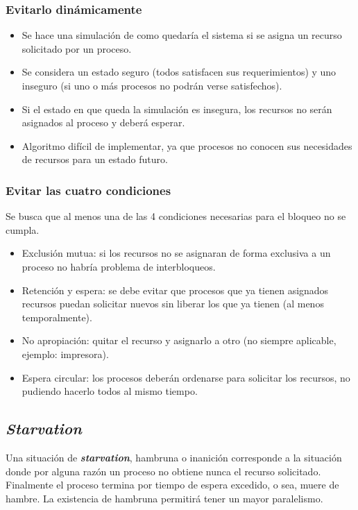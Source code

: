 \subsubsection{Evitarlo dinámicamente}
\begin{itemize}

	\item Se hace una simulación de como quedaría el sistema si se asigna un
	recurso solicitado por un proceso.

	\item Se considera un estado seguro (todos satisfacen sus
	requerimientos) y uno inseguro (si uno o más procesos no podrán verse
	satisfechos).

	\item Si el estado en que queda la simulación es insegura, los recursos
	no serán asignados al proceso y deberá esperar.

	\item Algoritmo difícil de implementar, ya que procesos no conocen sus
	necesidades de recursos para un estado futuro.

\end{itemize}

\subsubsection{Evitar las cuatro condiciones}
Se busca que al menos una de las 4 condiciones necesarias para el bloqueo no se
cumpla.
\begin{itemize}

	\item Exclusión mutua: si los recursos no se asignaran de forma
	exclusiva a un proceso no habría problema de interbloqueos.

	\item Retención y espera: se debe evitar que procesos que ya tienen
	asignados recursos puedan solicitar nuevos sin liberar los que ya tienen
	(al menos temporalmente).

	\item No apropiación: quitar el recurso y asignarlo a otro (no siempre
	aplicable, ejemplo: impresora).

	\item Espera circular: los procesos deberán ordenarse para solicitar los
	recursos, no pudiendo hacerlo todos al mismo tiempo.

\end{itemize}

\subsection{\textit{Starvation}}
Una situación de \textbf{\textit{starvation}}, hambruna o inanición corresponde
a la situación donde por alguna razón un proceso no obtiene nunca el recurso
solicitado. Finalmente el proceso termina por tiempo de espera excedido, o sea,
muere de hambre. La existencia de hambruna permitirá tener un mayor
paralelismo.

